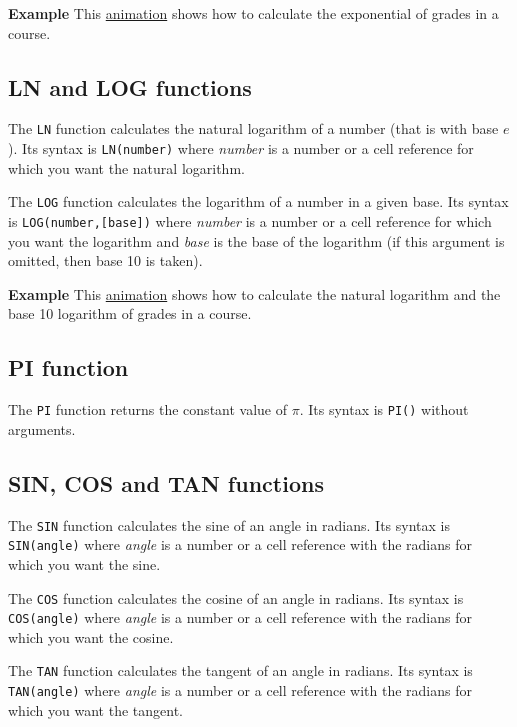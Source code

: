 \textbf{Example} This \href{http://aprendeconalf.es/office/excel/manual/img/example_function_exp.gif}{animation} shows how to calculate the exponential of grades in a course.

\subsection{LN and LOG functions}\hypertarget{ln-and-log-functions}{}\label{ln-and-log-functions}

The \texttt{LN} function calculates the natural logarithm of a number (that is with base $e$). Its syntax is \texttt{LN(number)} where \emph{number} is a number or a cell reference for which you want the natural logarithm.

The \texttt{LOG} function calculates the logarithm of a number in a given base. Its syntax is \texttt{LOG(number,[base])} where \emph{number} is a number or a cell reference for which you want the logarithm and \emph{base} is the base of the logarithm (if this argument is omitted, then base 10 is taken).

\textbf{Example} This \href{http://aprendeconalf.es/office/excel/manual/img/example_function_ln.gif}{animation} shows how to calculate the natural logarithm and the base 10 logarithm of grades in a course.

\subsection{PI function}\hypertarget{pi-function}{}\label{pi-function}

The \texttt{PI} function returns the constant value of $\pi$. Its syntax is \texttt{PI()} without arguments.

\subsection{SIN, COS and TAN functions}\hypertarget{sin-cos-and-tan-functions}{}\label{sin-cos-and-tan-functions}

The \texttt{SIN} function calculates the sine of an angle in radians. Its syntax is \texttt{SIN(angle)} where \emph{angle} is a number or a cell reference with the radians for which you want the sine.

The \texttt{COS} function calculates the cosine of an angle in radians. Its syntax is \texttt{COS(angle)} where \emph{angle} is a number or a cell reference with the radians for which you want the cosine.

The \texttt{TAN} function calculates the tangent of an angle in radians. Its syntax is \texttt{TAN(angle)} where \emph{angle} is a number or a cell reference with the radians for which you want the tangent.

